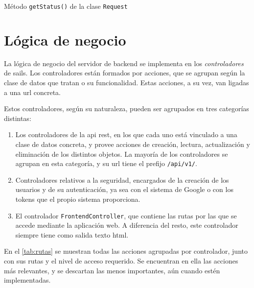 \documentclass[main]{subfiles}
\begin{document}
\begin{listing}
  \centering
  \caption{Método \texttt{getStatus()} de la clase \texttt{Request}}
  \label{lst:faborez-request-status}
\end{listing}



\section{Lógica de negocio}

La lógica de negocio del servidor de \gls{backend} se implementa en los \emph{controladores} de \gls{sails}. Los controladores están formados por acciones, que se agrupan según la clase de datos que tratan o su funcionalidad. Estas acciones, a su vez, van ligadas a una \gls{url} concreta.

Estos controladores, según su naturaleza, pueden ser agrupados en tres categorías distintas:

\begin{enumerate}
  \item Los controladores de la \gls{api} \gls{rest}, en los que cada uno está vinculado a una clase de datos concreta, y provee acciones de creación, lectura, actualización y eliminación de los distintos objetos. La mayoría de los controladores se agrupan en esta  categoría, y su \gls{url} tiene el prefijo \texttt{/api/v1/}.
  \item Controladores relativos a la seguridad, encargados de la creación de los usuarios y de su autenticación, ya sea con el sistema de Google o con los \glspl{token} que el propio sistema proporciona.
  \item El controlador \texttt{FrontendController}, que contiene las rutas por las que se accede mediante la aplicación web. A diferencia del resto, este controlador siempre tiene como salida texto \gls{html}.
\end{enumerate}

En el \cref{tab:rutas} se muestran todas las acciones agrupadas por controlador, junto con sus rutas y el nivel de acceso requerido. Se encuentran en ella las acciones más relevantes, y se descartan las menos importantes, aún cuando estén implementadas.
\end{document}
